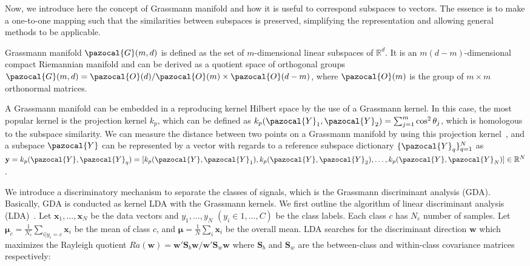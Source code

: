 Now, we introduce here the concept of Grassmann manifold and how it is useful to correspond subspaces to vectors. The essence is to make a one-to-one mapping such that the similarities between subspaces is preserved, simplifying the representation and allowing general methods to be applicable.

Grassmann manifold $\pazocal{G}(m, d)$ is defined as the set of $m$-dimensional linear subspaces of $\mathbb{R}^{d}$. It is an $m(d-m)$-dimensional compact Riemannian manifold and can be derived as a quotient space of orthogonal groups $\pazocal{G}(m, d) = \pazocal{O}(d)/\pazocal{O}(m) \times \pazocal{O}(d - m)$,
where $\pazocal{O}(m)$ is the group of $m \times m$ orthonormal matrices.

A Grassmann manifold can be embedded in a reproducing kernel Hilbert space by the use of a Grassmann kernel. In this case, the most popular kernel is the projection kernel $k_{p}$, which can be defined as $k_{p}(\pazocal{Y}_{1},\pazocal{Y}_{2}) = \sum_{j=1}^{m} \cos^{2} \theta_{j}$, which is homologous to the subspace similarity.
We can measure the distance between two points on a Grassmann manifold by using this projection kernel~\cite{hamm2008thesis}, and a subspace $\pazocal{Y}$ can be represented by a vector with regards to a reference subspace dictionary $\{\pazocal{Y}_{q}\}_{q=1}^{N}$ as $\mathbf{y} = k_{p}(\pazocal{Y},\pazocal{Y}_{q}) = [k_{p}(\pazocal{Y},\pazocal{Y}_{1}),k_{p}(\pazocal{Y},\pazocal{Y}_{2}),\ldots,k_{p}(\pazocal{Y},\pazocal{Y}_{N})] \in \mathbb{R}^{N}$.


We introduce a discriminatory mechanism to separate the classes of signals, which is the Grassmann discriminant analysis (GDA).
Basically, GDA is conducted as kernel LDA with the Grassmann kernels.
We first outline the algorithm of linear discriminant analysis (LDA)~\cite{fukunaga1990statistical}.
Let ${\mathbf{x}_{1}, \ldots, \mathbf{x}_{N}}$ be the data vectors and ${y_{1}, \ldots, y_{N}}$ $(y_{i} \in {1, \ldots, C})$ be the class labels.
Each class $c$ has $N_{c}$ number of samples.
Let $\mathbf{\mu}_{c} = \frac{1}{N_{c}}\sum_{i|y_{i} = c} \mathbf{x}_{i}$ be the mean of class $c$, and $\mathbf{\mu} = \frac{1}{N} \sum_{i} \mathbf{x}_{i}$ be the overall mean. LDA searches for the discriminant direction $\mathbf{w}$ which maximizes the Rayleigh quotient
$Ra(\mathbf{w}) = \mathbf{w}'\mathbf{S}_{b}\mathbf{w}/\mathbf{w}'\mathbf{S}_{w}\mathbf{w}$ where $\mathbf{S}_{b}$ and $\mathbf{S}_{w}$ are the between-class and within-class covariance matrices respectively:

